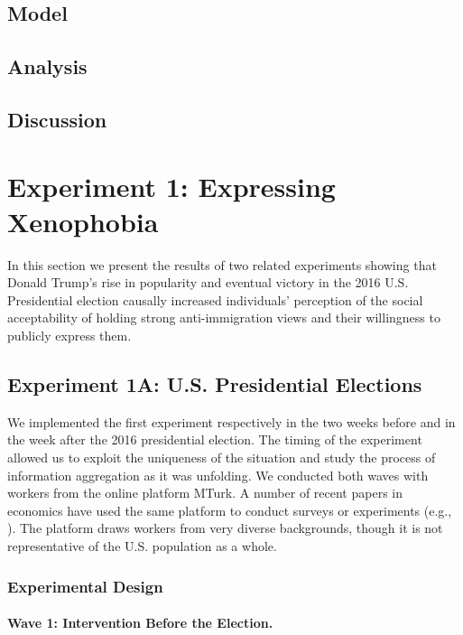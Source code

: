 \documentclass[11pt]{article}
\begin{document}
\subsection{Model}

\subsection{Analysis}

\subsection{Discussion}



\section{Experiment 1: Expressing Xenophobia} \label{secexp1}

In this section we present the results of two related experiments showing that Donald Trump's rise in popularity and eventual victory in the 2016 U.S. Presidential election causally increased individuals' perception of the social acceptability of holding strong anti-immigration views and their willingness to publicly express them.




\subsection{Experiment 1A: U.S. Presidential Elections} 

We implemented the first experiment respectively in the two weeks before and in the week after the 2016 presidential election. The timing of the experiment allowed us to exploit the uniqueness of the situation and study the process of information aggregation as it was unfolding. We conducted both waves with workers from the online platform MTurk. A number of recent papers in economics have used the same platform to conduct surveys or experiments (e.g., \citealp{kuziemco_et_al_2015_elastic}). The platform draws workers from very diverse backgrounds, though it is not representative of the U.S. population as a whole.

\subsubsection{Experimental Design}


\paragraph{Wave 1: Intervention Before the Election.}
\end{document}
